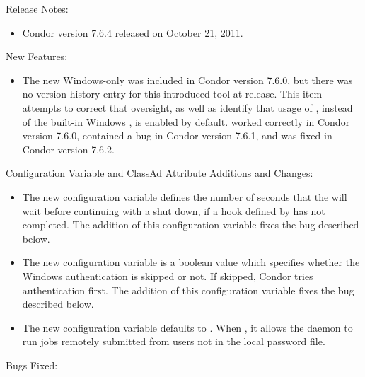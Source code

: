 \noindent Release Notes:

\begin{itemize}

\item Condor version 7.6.4 released on October 21, 2011.

\end{itemize}


\noindent New Features:

\begin{itemize}

\item The new Windows-only  was included in Condor version 7.6.0,
but there was no version history entry for this introduced tool at release.
This item attempts to correct that oversight, 
as well as identify that usage of ,
instead of the built-in Windows , 
is enabled by default.
 worked correctly in Condor version 7.6.0, 
contained a bug in Condor version 7.6.1,
and was fixed in Condor version 7.6.2.


\end{itemize}

\noindent Configuration Variable and ClassAd Attribute Additions and Changes:

\begin{itemize}

\item The new configuration variable 
defines the number of seconds that the  will wait
before continuing with a shut down,
if a hook defined by  has not completed.
The addition of this configuration variable fixes the bug described below.

\item The new configuration variable  
is a boolean value which specifies whether the Windows
 authentication is skipped or not.
If skipped, Condor tries  authentication first.
The addition of this configuration variable fixes the bug described below.

\item The new configuration variable  
defaults to .
When , 
it allows the  daemon to run jobs remotely submitted from 
users not in the local password file.

\end{itemize}
\noindent Bugs Fixed:

